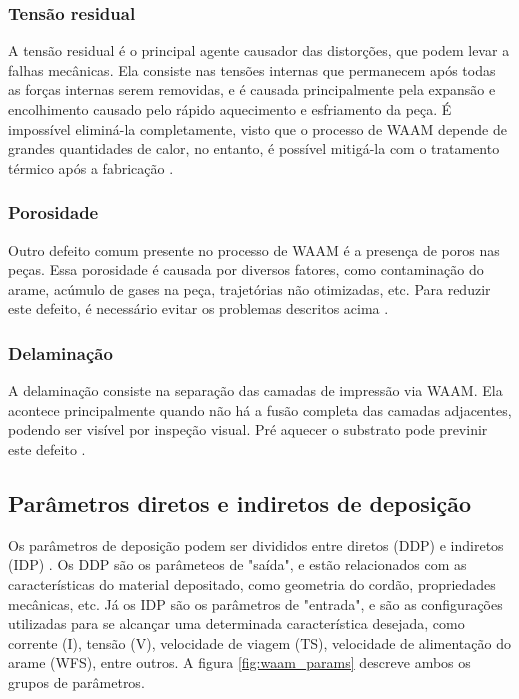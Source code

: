 \subsubsection{Tensão residual}
A tensão residual é o principal agente causador das distorções, que podem levar a falhas mecânicas. Ela consiste nas tensões internas que permanecem após todas as forças internas serem removidas, e é causada principalmente pela expansão e encolhimento causado pelo rápido aquecimento e esfriamento da peça. É impossível eliminá-la completamente, visto que o processo de WAAM depende de grandes quantidades de calor, no entanto, é possível mitigá-la com o tratamento térmico após a fabricação \cite{wu2018review}. 

\subsubsection{Porosidade}
Outro defeito comum presente no processo de WAAM é a presença de poros nas peças. Essa porosidade é causada por diversos fatores, como contaminação do arame, acúmulo de gases na peça, trajetórias não otimizadas, etc. Para reduzir este defeito, é necessário evitar os problemas descritos acima \cite{wu2018review}. 

\subsubsection{Delaminação}
A delaminação consiste na separação das camadas de impressão via WAAM. Ela acontece principalmente quando não há a fusão completa das camadas adjacentes, podendo ser visível por inspeção visual. Pré aquecer o substrato pode previnir este defeito \cite{wu2018review}.

\subsection{Parâmetros diretos e indiretos de deposição}
Os parâmetros de deposição podem ser divididos entre diretos (DDP) e indiretos (IDP) \cite{ozcelik2003modeling}. Os DDP são os parâmeteos de "saída", e estão relacionados com as características do material depositado, como geometria do cordão, propriedades mecânicas, etc. Já os IDP são os parâmetros de "entrada", e são as configurações utilizadas para se alcançar uma determinada característica desejada, como corrente (I), tensão (V), velocidade de viagem (TS), velocidade de alimentação do arame (WFS), entre outros. A figura \ref{fig:waam_params} descreve ambos os grupos de parâmetros. 

